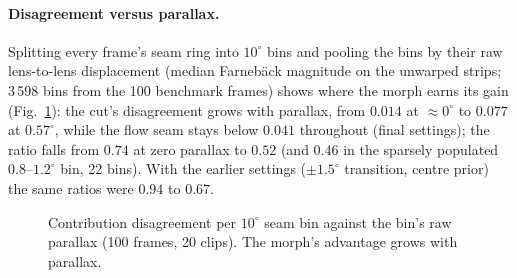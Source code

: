 \documentclass[11pt]{article}
\begin{document}
\paragraph{Disagreement versus parallax.} Splitting every frame's seam ring into $10^\circ$ bins and pooling the bins by their raw lens-to-lens displacement (median Farneb\"ack magnitude on the unwarped strips; 3\,598 bins from the 100 benchmark frames) shows where the morph earns its gain (Fig.~\ref{fig:parallax}): the cut's disagreement grows with parallax, from $0.014$ at $\approx0^\circ$ to $0.077$ at $0.57^\circ$, while the flow seam stays below $0.041$ throughout (final settings); the ratio falls from $0.74$ at zero parallax to $0.52$ (and $0.46$ in the sparsely populated $0.8$--$1.2^\circ$ bin, 22 bins). With the earlier settings ($\pm1.5^\circ$ transition, centre prior) the same ratios were $0.94$ to $0.67$.

\begin{figure}[t]
\centering
{}
\caption{Contribution disagreement per $10^\circ$ seam bin against the bin's raw parallax (100 frames, 20 clips). The morph's advantage grows with parallax.}
\label{fig:parallax}
\end{figure}
\end{document}

